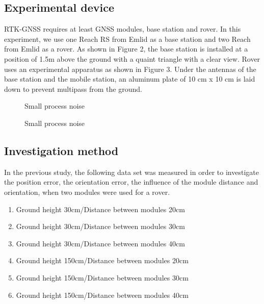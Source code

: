\documentclass[a4paper]{article}
\begin{document}
\subsection{Experimental device}
RTK-GNSS requires at least GNSS modules, base station and rover. 
In this experiment, we use one Reach RS\cite{reach rs} from Emlid as a base station 
and two Reach\cite{reach} from Emlid as a rover.
As shown in Figure 2, the base station is installed at a position of 1.5m above the ground 
with a quaint triangle with a clear view.
Rover uses an experimental apparatus as shown in Figure 3. 
Under the antennas of the base station and the mobile station, 
an aluminum plate of 10 cm x 10 cm is laid down to prevent multipass from the ground.

\begin{figure}[H]
    \centerline{}
    \caption{Small process noise}
    \centerline{}
    \caption{Small process noise}
\end{figure}

\subsection{Investigation method}
In the previous study, the following data set was measured in order to 
investigate the position error, the orientation error, 
the influence of the module distance and orientation, when two modules were used for a rover.
\begin{enumerate}
    \renewcommand{\labelenumi}{(\roman{enumi})}
    \item Ground height 30cm/Distance between modules 20cm
    \item Ground height 30cm/Distance between modules 30cm
    \item Ground height 30cm/Distance between modules 40cm
    \item Ground height 150cm/Distance between modules 20cm
    \item Ground height 150cm/Distance between modules 30cm
    \item Ground height 150cm/Distance between modules 40cm
\end{enumerate}
\end{document}
